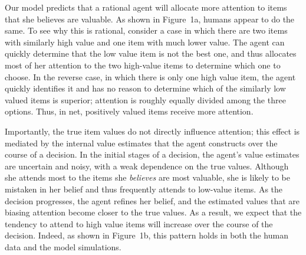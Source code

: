 \documentclass[11pt]{article} %
\begin{document}
Our model predicts that a rational agent will allocate more attention to items that she believes are valuable. As shown in Figure~1a, humans appear to do the same. To see why this is rational, consider a case in which there are two items with similarly high value and one item with much lower value. The agent can quickly determine that the low value item is not the best one, and thus allocates most of her attention to the two high-value items to determine which one to choose. In the reverse case, in which there is only one high value item, the agent quickly identifies it and has no reason to determine which of the similarly low valued items is superior; attention is roughly equally divided among the three options. Thus, in net, positively valued items receive more attention.

Importantly, the true item values do not directly influence attention; this effect is mediated by the internal value estimates that the agent constructs over the course of a decision. In the initial stages of a decision, the agent's value estimates are uncertain and noisy, with a weak dependence on the true values. Although she attends most to the items she \emph{believes} are most valuable, she is likely to be mistaken in her belief and thus frequently attends to low-value items. As the decision progresses, the agent refines her belief, and the estimated values that are biasing attention become closer to the true values. As a result, we expect that the tendency to attend to high value items will increase over the course of the decision. Indeed, as shown in Figure~1b, this pattern holds in both the human data and the model simulations.

\end{document}

